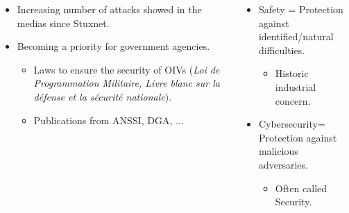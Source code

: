 \documentclass{beamer}
\newcommand{\Cybersec}{Cybersecurity\xspace}
\begin{document}
\begin{frame}[fragile]{}
\begin{columns}[T]
\begin{column}{.49\textwidth}
\begin{tcolorbox}[adjusted title={\centering\large Industrial Systems}]
\begin{columns}
                \end{columns}
                \begin{itemize}
                    \item Increasing number of attacks showed in the medias since Stuxnet.
                    \item Becoming a priority for government agencies.
                    \begin{itemize}
                        \item Laws to ensure the security of OIVs ({\em Loi de Programmation Militaire, Livre blanc sur la défense et la sécurité nationale}).
                        \item Publications from ANSSI, DGA, ...
                    \end{itemize}
                \end{itemize}
            \end{tcolorbox}
        \end{column}
        \begin{column}{.49\textwidth}
            \begin{tcolorbox}[adjusted title={\centering\large Security concepts}]
                \vspace{.25em}
                \begin{itemize}
                    \item Safety = Protection against identified/natural difficulties.
                    \begin{itemize}
                        \item Historic industrial concern.
                    \end{itemize}
                    \item \Cybersec = Protection against malicious adversaries.
                    \begin{itemize}
                        \item Often called Security.
                    \end{itemize}
                \end{itemize}


\end{tcolorbox}
\end{column}
\end{columns}
\end{frame}
\end{document}

